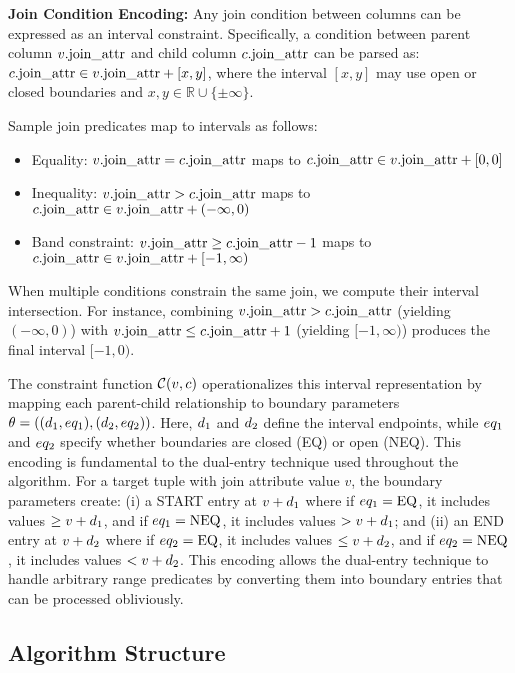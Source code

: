 \textbf{Join Condition Encoding:} Any join condition between columns can be expressed as an interval constraint. Specifically, a condition between parent column $v.\text{join\_attr}$ and child column $c.\text{join\_attr}$ can be parsed as: $c.\text{join\_attr} \in v.\text{join\_attr} + [x, y]$, where the interval $[x, y]$ may use open or closed boundaries and $x, y \in \mathbb{R} \cup \{\pm\infty\}$.

Sample join predicates map to intervals as follows:
\begin{itemize}
\item Equality: $v.\text{join\_attr} = c.\text{join\_attr}$ maps to $c.\text{join\_attr} \in v.\text{join\_attr} + [0, 0]$
\item Inequality: $v.\text{join\_attr} > c.\text{join\_attr}$ maps to $c.\text{join\_attr} \in v.\text{join\_attr} + (-\infty, 0)$
\item Band constraint: $v.\text{join\_attr} \geq c.\text{join\_attr} - 1$ maps to $c.\text{join\_attr} \in v.\text{join\_attr} + [-1, \infty)$
\end{itemize}

When multiple conditions constrain the same join, we compute their interval intersection. For instance, combining $v.\text{join\_attr} > c.\text{join\_attr}$ (yielding $(-\infty, 0)$) with $v.\text{join\_attr} \leq c.\text{join\_attr} + 1$ (yielding $[-1, \infty)$) produces the final interval $[-1, 0)$.

The constraint function $\mathcal{C}(v,c)$ operationalizes this interval representation by mapping each parent-child relationship to boundary parameters $\theta = ((d_1, eq_1), (d_2, eq_2))$. Here, $d_1$ and $d_2$ define the interval endpoints, while $eq_1$ and $eq_2$ specify whether boundaries are closed (EQ) or open (NEQ). This encoding is fundamental to the dual-entry technique used throughout the algorithm. For a target tuple with join attribute value $v$, the boundary parameters create: (i) a START entry at $v + d_1$ where if $eq_1 = \text{EQ}$, it includes values $\geq v + d_1$, and if $eq_1 = \text{NEQ}$, it includes values $> v + d_1$; and (ii) an END entry at $v + d_2$ where if $eq_2 = \text{EQ}$, it includes values $\leq v + d_2$, and if $eq_2 = \text{NEQ}$, it includes values $< v + d_2$. This encoding allows the dual-entry technique to handle arbitrary range predicates by converting them into boundary entries that can be processed obliviously.

\subsection{Algorithm Structure}

